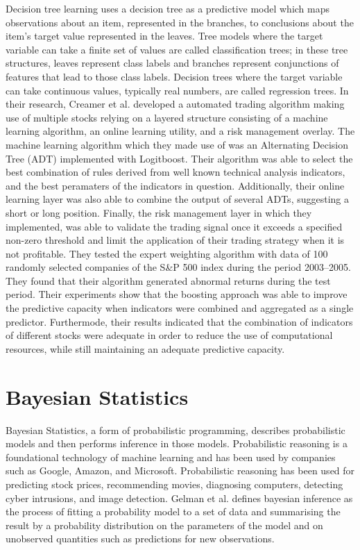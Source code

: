 Decision tree learning uses a decision tree as a predictive model which maps observations about an item, represented in the branches, to conclusions about the item's target value represented in the leaves. Tree models where the target variable can take a finite set of values are called classification trees; in these tree structures, leaves represent class labels and branches represent conjunctions of features that lead to those class labels. Decision trees where the target variable can take continuous values, typically real numbers, are called regression trees. In their research, Creamer et al. developed a automated trading algorithm making use of multiple stocks relying on a layered structure consisting of a machine learning algorithm, an online learning utility, and a risk management overlay.\cite{Creamer:2010aa} The machine learning algorithm which they made use of was an Alternating Decision Tree (ADT) implemented with Logitboost. Their algorithm was able to select the best combination of rules derived from well known technical analysis indicators, and the best peramaters of the indicators in question. Additionally, their online learning layer was also able to combine the output of several ADTs, suggesting a short or long position. Finally, the risk management layer in which they implemented, was able to validate the trading signal once it exceeds a specified non-zero threshold and limit the application of their trading strategy when it is not profitable. They tested the expert weighting algorithm with data of 100 randomly selected companies of the S\&P 500 index during the period 2003–2005. They found that their algorithm generated abnormal returns during the test period. Their experiments show that the boosting approach was able to improve the predictive capacity when indicators were combined and aggregated as a single predictor. Furthermode, their results indicated that the combination of indicators of different stocks were adequate in order to reduce the use of computational resources, while still maintaining an adequate predictive capacity.

\section{Bayesian Statistics}

Bayesian Statistics, a form of probabilistic programming, describes probabilistic models and then performs inference in those models. Probabilistic reasoning is a foundational technology of machine learning and has been used by companies such as Google, Amazon, and Microsoft. Probabilistic reasoning has been used for predicting stock prices, recommending movies, diagnosing computers, detecting cyber intrusions, and image detection. Gelman et al. defines bayesian inference as the process of fitting a probability model to a set of data and summarising the result by a probability distribution on the parameters of the model and on unobserved quantities such as predictions for new observations.\cite{Gelman:2014aa}

